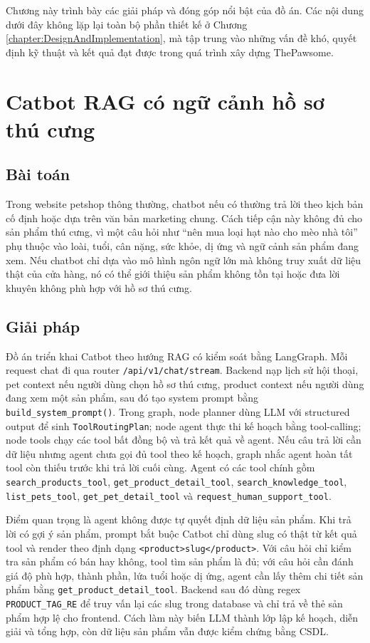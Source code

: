 \documentclass[../DoAn.tex]{subfiles}
\begin{document}
Chương này trình bày các giải pháp và đóng góp nổi bật của đồ án. Các nội dung dưới đây không lặp lại toàn bộ phần thiết kế ở Chương \ref{chapter:DesignAndImplementation}, mà tập trung vào những vấn đề khó, quyết định kỹ thuật và kết quả đạt được trong quá trình xây dựng ThePawsome.

\section{Catbot RAG có ngữ cảnh hồ sơ thú cưng}
\label{section:5.1}

\subsection{Bài toán}
\label{subsection:5.1.1}

Trong website petshop thông thường, chatbot nếu có thường trả lời theo kịch bản cố định hoặc dựa trên văn bản marketing chung. Cách tiếp cận này không đủ cho sản phẩm thú cưng, vì một câu hỏi như ``nên mua loại hạt nào cho mèo nhà tôi'' phụ thuộc vào loài, tuổi, cân nặng, sức khỏe, dị ứng và ngữ cảnh sản phẩm đang xem. Nếu chatbot chỉ dựa vào mô hình ngôn ngữ lớn mà không truy xuất dữ liệu thật của cửa hàng, nó có thể giới thiệu sản phẩm không tồn tại hoặc đưa lời khuyên không phù hợp với hồ sơ thú cưng.

\subsection{Giải pháp}
\label{subsection:5.1.2}

Đồ án triển khai Catbot theo hướng RAG có kiểm soát bằng LangGraph. Mỗi request chat đi qua router \texttt{/api/v1/chat/stream}. Backend nạp lịch sử hội thoại, pet context nếu người dùng chọn hồ sơ thú cưng, product context nếu người dùng đang xem một sản phẩm, sau đó tạo system prompt bằng \texttt{build\_system\_prompt()}. Trong graph, node planner dùng LLM với structured output để sinh \texttt{ToolRoutingPlan}; node agent thực thi kế hoạch bằng tool-calling; node tools chạy các tool bất đồng bộ và trả kết quả về agent. Nếu câu trả lời cần dữ liệu nhưng agent chưa gọi đủ tool theo kế hoạch, graph nhắc agent hoàn tất tool còn thiếu trước khi trả lời cuối cùng. Agent có các tool chính gồm \texttt{search\_products\_tool}, \texttt{get\_product\_detail\_tool}, \texttt{search\_knowledge\_tool}, \texttt{list\_pets\_tool}, \texttt{get\_pet\_detail\_tool} và \texttt{request\_human\_support\_tool}.

Điểm quan trọng là agent không được tự quyết định dữ liệu sản phẩm. Khi trả lời có gợi ý sản phẩm, prompt bắt buộc Catbot chỉ dùng slug có thật từ kết quả tool và render theo định dạng \texttt{\textless product\textgreater slug\textless/product\textgreater}. Với câu hỏi chỉ kiểm tra sản phẩm có bán hay không, tool tìm sản phẩm là đủ; với câu hỏi cần đánh giá độ phù hợp, thành phần, lứa tuổi hoặc dị ứng, agent cần lấy thêm chi tiết sản phẩm bằng \texttt{get\_product\_detail\_tool}. Backend sau đó dùng regex \texttt{PRODUCT\_TAG\_RE} để truy vấn lại các slug trong database và chỉ trả về thẻ sản phẩm hợp lệ cho frontend. Cách làm này biến LLM thành lớp lập kế hoạch, diễn giải và tổng hợp, còn dữ liệu sản phẩm vẫn được kiểm chứng bằng CSDL.
\end{document}

